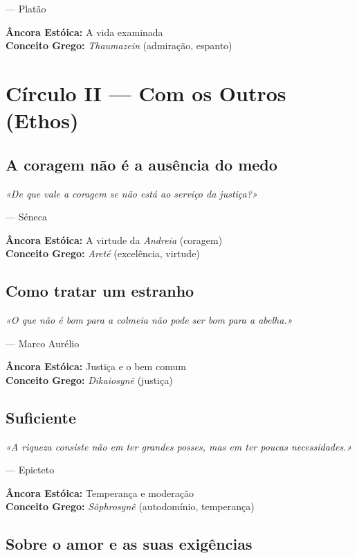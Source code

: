 \documentclass[
  11pt,
  a5paper,
]{book}
\begin{document}
--- Platão

\textbf{Âncora Estóica:} A vida examinada\\
\textbf{Conceito Grego:} \emph{Thaumazein} (admiração, espanto)

\part{Círculo II --- Com os Outros (Ethos)}

\chapter{A coragem não é a ausência do
medo}\label{a-coragem-nuxe3o-uxe9-a-ausuxeancia-do-medo}

\emph{«De que vale a coragem se não está ao serviço da justiça?»}

--- Séneca

\textbf{Âncora Estóica:} A virtude da \emph{Andreia} (coragem)\\
\textbf{Conceito Grego:} \emph{Areté} (excelência, virtude)

\chapter{Como tratar um estranho}\label{como-tratar-um-estranho}

\emph{«O que não é bom para a colmeia não pode ser bom para a abelha.»}

--- Marco Aurélio

\textbf{Âncora Estóica:} Justiça e o bem comum\\
\textbf{Conceito Grego:} \emph{Dikaiosynê} (justiça)

\chapter{Suficiente}\label{suficiente}

\emph{«A riqueza consiste não em ter grandes posses, mas em ter poucas
necessidades.»}

--- Epicteto

\textbf{Âncora Estóica:} Temperança e moderação\\
\textbf{Conceito Grego:} \emph{Sôphrosynê} (autodomínio, temperança)

\chapter{Sobre o amor e as suas
exigências}\label{sobre-o-amor-e-as-suas-exiguxeancias}
\end{document}
